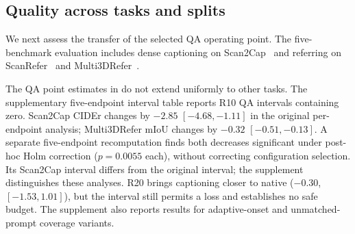 \subsection{Quality across tasks and splits}
We next assess the transfer of the selected QA operating point. The five-benchmark evaluation includes dense captioning on Scan2Cap~\cite{chen2021scan2cap} and referring on ScanRefer~\cite{chen2020scanrefer} and Multi3DRefer~\cite{zhang2023multi3drefer}.
\begin{table}[t]
\centering
\caption{\textbf{Five-benchmark evaluation on 3D-LLaVA.} L14/R10 unless R=20\% is specified. Full sets use official protocols and beam 1. Scan2Cap CIDEr@0.25 scores all 2068 corpus entries, including 2007 with Mask3D predictions and 61 with empty hypotheses. Deltas are computed before rounding. R10 captioning and Multi3DRefer losses are supported by the reported interval analyses; QA and R20 captioning changes remain unresolved.}
\label{tab:five}
\end{table}

The QA point estimates in  do not extend uniformly to other tasks. The supplementary five-endpoint interval table reports R10 QA intervals containing zero. Scan2Cap CIDEr changes by $-2.85$ $[-4.68,-1.11]$ in the original per-endpoint analysis; Multi3DRefer mIoU changes by $-0.32$ $[-0.51,-0.13]$. A separate five-endpoint recomputation finds both decreases significant under post-hoc Holm correction ($p=0.0055$ each), without correcting configuration selection. Its Scan2Cap interval differs from the original interval; the supplement distinguishes these analyses. R20 brings captioning closer to native ($-0.30$, $[-1.53,1.01]$), but the interval still permits a loss and establishes no safe budget. The supplement also reports results for adaptive-onset and unmatched-prompt coverage variants.

